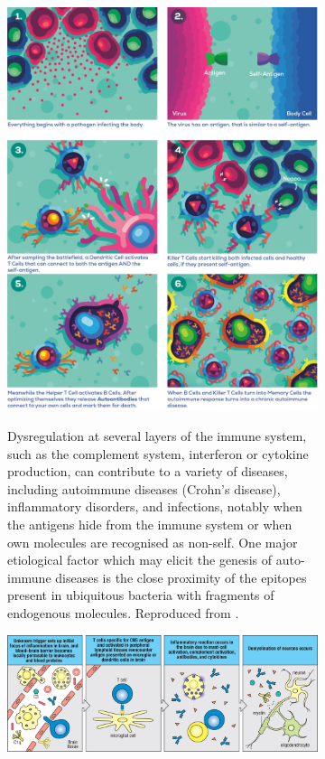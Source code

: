 \begin{figure}
\begin{subfigure}[p]{0.45\textwidth}
         \includegraphics[width=\textwidth]{figures/immuno/kurzgesagt_autoimmune_origin.jpg}
         \label{subfig:autoimmune-origin}
         \caption[\textbf{Cross-reactivity, a prominent etiological factor in the initiation of autoimmune diseases.}]{Dysregulation at several layers of the immune system,  such as the complement system, interferon or cytokine production, can contribute to a variety of diseases, including autoimmune diseases (Crohn’s disease), inflammatory disorders, and infections, notably when the antigens hide from the immune system or when own molecules are recognised as non-self. One major etiological factor which may elicit the genesis of auto-immune diseases is the close proximity of the epitopes present in ubiquitous bacteria with fragments of endogenous molecules. Reproduced from \autocite[Fig. 1, Chap. 40]{dettmer21}.}
     \end{subfigure}
     \vfill
     \begin{subfigure}[p]{0.8\textwidth}
         \centering
         \includegraphics[width=\textwidth]{figures/immuno/cross_reactivity.jpg}

\end{subfigure}
\end{figure}
